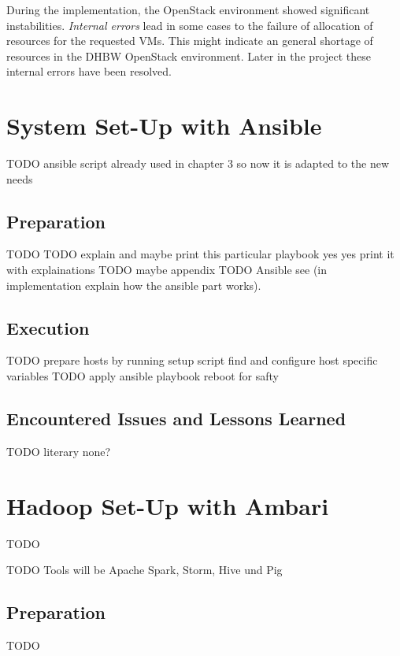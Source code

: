 During the implementation, the OpenStack environment showed significant instabilities.
\emph{Internal errors} lead in some cases to the failure of allocation of resources for the requested \acp{VM}.
This might indicate an general shortage of resources in the \ac{DHBW} OpenStack environment. Later in the project these internal errors have been resolved.

\section{System Set-Up with Ansible}

TODO ansible script already used in chapter 3 so now it is adapted to the new needs

\subsection{Preparation}

TODO
TODO explain and maybe print this particular playbook yes yes print it with explainations
TODO maybe appendix
TODO Ansible
see 
     (in implementation explain how the ansible part works). 
     


\subsection{Execution}


TODO prepare hosts by running setup script
find and configure host specific variables
TODO apply ansible playbook
reboot for safty

\subsection{Encountered Issues and Lessons Learned}

TODO
literary none?

\section{Hadoop Set-Up with Ambari}

TODO

TODO Tools will be Apache Spark, Storm, Hive und Pig

\subsection{Preparation}
TODO


